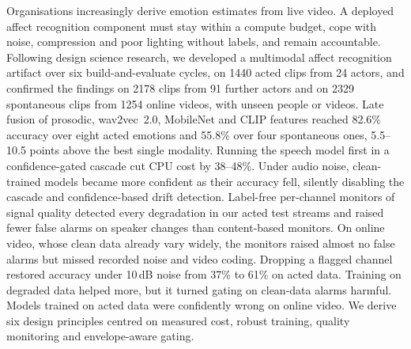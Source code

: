 Organisations increasingly derive emotion estimates from live video. A deployed affect recognition component must stay within a compute budget, cope with noise, compression and poor lighting without labels, and remain accountable. Following design science research, we developed a multimodal affect recognition artifact over six build-and-evaluate cycles, on 1440 acted clips from 24 actors, and confirmed the findings on 2178 clips from 91 further actors and on 2329 spontaneous clips from 1254 online videos, with unseen people or videos. Late fusion of prosodic, wav2vec~2.0, MobileNet and CLIP features reached 82.6\% accuracy over eight acted emotions and 55.8\% over four spontaneous ones, 5.5--10.5 points above the best single modality. Running the speech model first in a confidence-gated cascade cut CPU cost by 38--48\%. Under audio noise, clean-trained models became more confident as their accuracy fell, silently disabling the cascade and confidence-based drift detection. Label-free per-channel monitors of signal quality detected every degradation in our acted test streams and raised fewer false alarms on speaker changes than content-based monitors. On online video, whose clean data already vary widely, the monitors raised almost no false alarms but missed recorded noise and video coding. Dropping a flagged channel restored accuracy under 10\,dB noise from 37\% to 61\% on acted data. Training on degraded data helped more, but it turned gating on clean-data alarms harmful. Models trained on acted data were confidently wrong on online video. We derive six design principles centred on measured cost, robust training, quality monitoring and envelope-aware gating.
